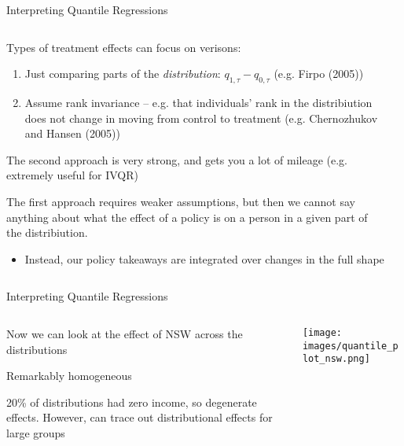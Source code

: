 \documentclass[notes,11pt, aspectratio=169]{beamer}
\newenvironment{wideitemize}{\itemize\addtolength{\itemsep}{10pt}}{\enditemize}
\begin{document}
\begin{frame}{Interpreting Quantile Regressions}
  \begin{columns}[T] %
    \begin{column}{.7\textwidth}
      \begin{wideitemize}
      \item Types of treatment effects can focus on verisons:
        \begin{enumerate}
        \item Just comparing parts of the \emph{distribution}: $q_{1,\tau} - q_{0,\tau}$ (e.g. Firpo (2005))
        \item Assume rank invariance -- e.g. that individuals' rank
          in the distribiution does not change in moving from
          control to treatment (e.g. Chernozhukov and Hansen (2005))
        \end{enumerate}
      \item The second approach is very strong, and gets you a lot
        of mileage (e.g. extremely useful for IVQR)
      \item The first approach requires weaker assumptions, but then
        we cannot say anything about what the effect of a policy is on
        a person in a given part of the distribiution.
        \begin{itemize}
        \item Instead, our policy takeaways are integrated over changes in the full shape
        \end{itemize}
      \end{wideitemize}
    \end{column}%
    \hfill%
    \begin{column}{.4\textwidth}
    \end{column}
  \end{columns}
\end{frame}

\begin{frame}{Interpreting Quantile Regressions}
  \begin{columns}[T] %
    \begin{column}{.5\textwidth}
      \begin{wideitemize}
      \item Now we can look at the effect of NSW across the distributions
      \item Remarkably homogeneous
      \item 20\% of distributions had zero income, so degenerate
        effects. However, can trace out distributional effects for
        large groups
      \end{wideitemize}
    \end{column}%
    \hfill%
    \begin{column}{.5\textwidth}
      \texttt{[image: images/quantile\_plot\_nsw.png]}
    \end{column}
  \end{columns}
\end{frame}
\end{document}
